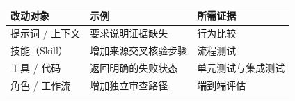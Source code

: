 \begin{tabular}{@{}P{3.3cm}P{5.3cm}P{3.9cm}@{}}
\toprule
\textbf{改动对象} & \textbf{示例} & \textbf{所需证据} \\
\midrule
提示词 / 上下文 & 要求说明证据缺失 & 行为比较 \\
技能（Skill） & 增加来源交叉核验步骤 & 流程测试 \\
工具 / 代码 & 返回明确的失败状态 & 单元测试与集成测试 \\
角色 / 工作流 & 增加独立审查路径 & 端到端评估 \\
\bottomrule
\end{tabular}

